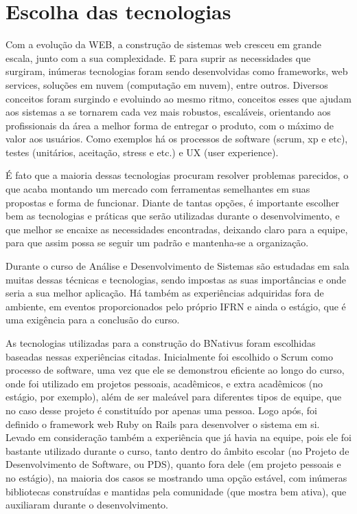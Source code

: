\section{Escolha das tecnologias}

Com a evolução da WEB, a construção de sistemas web cresceu em grande escala, junto com a sua complexidade. E para suprir as necessidades que surgiram, inúmeras tecnologias foram sendo desenvolvidas como frameworks, web services, soluções em nuvem (computação em nuvem), entre outros. Diversos conceitos foram surgindo e evoluindo ao mesmo ritmo, conceitos esses que ajudam aos sistemas a se tornarem cada vez mais robustos, escaláveis, orientando aos profissionais da área a melhor forma de entregar o produto, com o máximo de valor aos usuários. Como exemplos há os processos de software (scrum, xp e etc), testes (unitários, aceitação, stress e etc.) e UX (user experience). 

É fato que a maioria dessas tecnologias procuram resolver problemas parecidos, o que acaba montando um mercado com ferramentas semelhantes em suas propostas e forma de funcionar. Diante de tantas opções, é importante escolher bem as tecnologias e práticas que serão utilizadas durante o desenvolvimento, e que melhor se encaixe as necessidades encontradas, deixando claro para a equipe, para que assim possa se seguir um padrão e mantenha-se a organização. 

Durante o curso de Análise e Desenvolvimento de Sistemas são estudadas em sala muitas dessas técnicas e tecnologias, sendo impostas as suas importâncias e onde seria a sua melhor aplicação. Há também as experiências adquiridas fora de ambiente, em eventos proporcionados pelo próprio IFRN e ainda o estágio, que é uma exigência para a conclusão do curso.

As tecnologias utilizadas para a construção do BNativus foram escolhidas baseadas nessas experiências citadas. Inicialmente foi escolhido o Scrum como processo de software, uma vez que ele se demonstrou eficiente ao longo do curso, onde foi utilizado em projetos pessoais, acadêmicos, e extra acadêmicos (no estágio, por exemplo), além de ser maleável para diferentes tipos de equipe, que no caso desse projeto é constituído por apenas uma pessoa. Logo após, foi definido o framework web Ruby on Rails para desenvolver o sistema em si. Levado em consideração também a experiência que já havia na equipe, pois ele foi bastante utilizado durante o curso, tanto dentro do âmbito escolar (no Projeto de Desenvolvimento de Software, ou PDS), quanto fora dele (em projeto pessoais e no estágio), na maioria dos casos se mostrando uma opção estável, com inúmeras bibliotecas construídas e mantidas pela comunidade (que mostra bem ativa), que auxiliaram durante o desenvolvimento.

